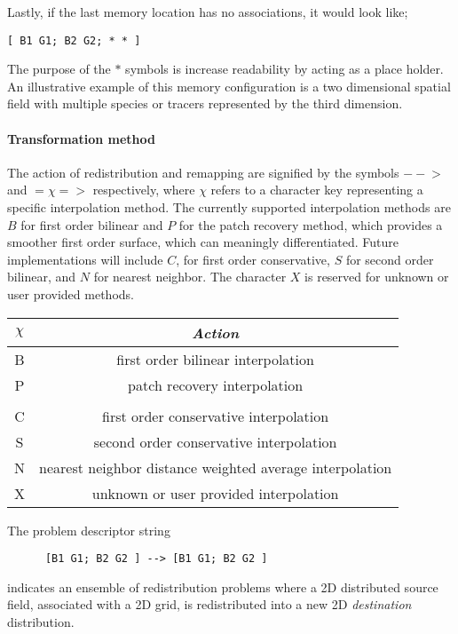 Lastly, if the last memory location has no associations, it would look like;
\begin{center}
\begin{verbatim}
[ B1 G1; B2 G2; * * ]
\end{verbatim}
\end{center}
The purpose of the $\ast$ symbols is increase readability by acting as a place holder. 
An illustrative example of this memory configuration is a two dimensional spatial field 
with multiple species or tracers represented by the third dimension.

\paragraph{Transformation method}
The action of redistribution and remapping are signified by the symbols $-- \!\!\! >$ and $=\chi=>$ 
respectively, where $\chi$ refers to a character key representing a specific interpolation method. 
The currently supported interpolation methods are $B$ for first order bilinear and $P$ 
for the patch recovery method, which provides a smoother first order surface, which can meaningly differentiated. 
Future implementations will include $C$, for first order conservative, $S$ for second order bilinear, 
and $N$ for nearest neighbor. The character $X$ is reserved for unknown or user provided methods. 

\begin{center}
\begin{tabular}{| c | c |} \hline 
{$\chi$} & {\em Action} \\
\hline \hline
  B & first order bilinear interpolation \\
  P & patch recovery interpolation \\
    &                                        \\
  C & first order conservative interpolation \\
  S & second order conservative interpolation \\
  N & nearest neighbor distance weighted average interpolation \\
  X & unknown or user provided interpolation \\
\hline
\end{tabular}
\end{center}

The problem descriptor string
\begin{center}
\begin{verbatim}
      [B1 G1; B2 G2 ] --> [B1 G1; B2 G2 ]
\end{verbatim}
\end{center}
indicates an ensemble of redistribution problems where a 2D distributed source field, associated with a 2D grid, is redistributed into a new  2D {\em destination} distribution. 

